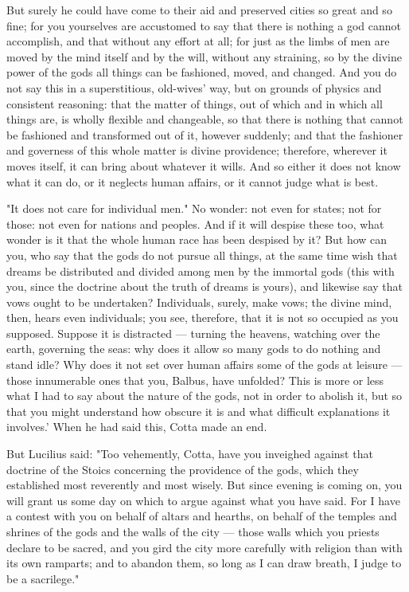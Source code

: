 But surely he could have come to their aid and preserved cities so great and so fine; for you yourselves are accustomed to say that there is nothing a god cannot accomplish, and that without any effort at all; for just as the limbs of men are moved by the mind itself and by the will, without any straining, so by the divine power of the gods all things can be fashioned, moved, and changed. And you do not say this in a superstitious, old-wives' way, but on grounds of physics and consistent reasoning: that the matter of things, out of which and in which all things are, is wholly flexible and changeable, so that there is nothing that cannot be fashioned and transformed out of it, however suddenly; and that the fashioner and governess of this whole matter is divine providence; therefore, wherever it moves itself, it can bring about whatever it wills. And so either it does not know what it can do, or it neglects human affairs, or it cannot judge what is best.

 "It does not care for individual men." No wonder: not even for states; not for those: not even for nations and peoples. And if it will despise these too, what wonder is it that the whole human race has been despised by it? But how can you, who say that the gods do not pursue all things, at the same time wish that dreams be distributed and divided among men by the immortal gods (this with you, since the doctrine about the truth of dreams is yours), and likewise say that vows ought to be undertaken? Individuals, surely, make vows; the divine mind, then, hears even individuals; you see, therefore, that it is not so occupied as you supposed. Suppose it is distracted — turning the heavens, watching over the earth, governing the seas: why does it allow so many gods to do nothing and stand idle? Why does it not set over human affairs some of the gods at leisure — those innumerable ones that you, Balbus, have unfolded? This is more or less what I had to say about the nature of the gods, not in order to abolish it, but so that you might understand how obscure it is and what difficult explanations it involves.' When he had said this, Cotta made an end.

 But Lucilius said: "Too vehemently, Cotta, have you inveighed against that doctrine of the Stoics concerning the providence of the gods, which they established most reverently and most wisely. But since evening is coming on, you will grant us some day on which to argue against what you have said. For I have a contest with you on behalf of altars and hearths, on behalf of the temples and shrines of the gods and the walls of the city — those walls which you priests declare to be sacred, and you gird the city more carefully with religion than with its own ramparts; and to abandon them, so long as I can draw breath, I judge to be a sacrilege."

